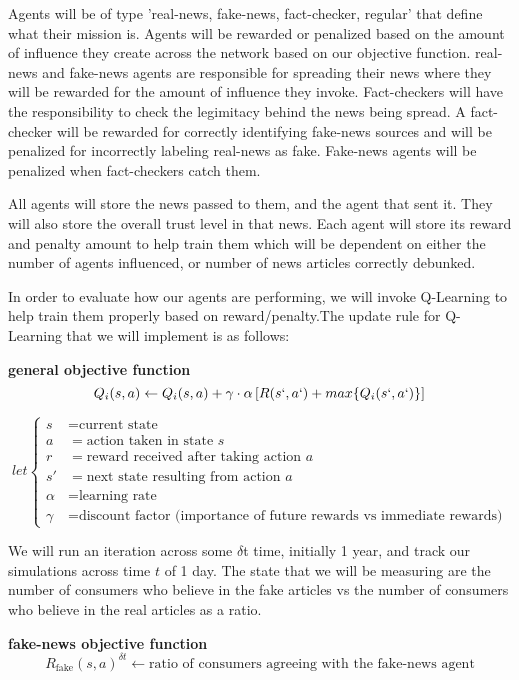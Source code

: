 \documentclass[twoside]{article}
\begin{document}
Agents will be of type 'real-news, fake-news, fact-checker, regular' that define what their mission is. Agents will be rewarded or penalized based on the amount of influence they create across the network based on our objective function. real-news and fake-news agents are responsible for spreading their news where they will be rewarded for the amount of influence they invoke. Fact-checkers will have the responsibility to check the legimitacy behind the news being spread. A fact-checker will be rewarded for correctly identifying fake-news sources and will be penalized for incorrectly labeling real-news as fake. Fake-news agents will be penalized when fact-checkers catch them.

All agents will store the news passed to them, and the agent that sent it. They will also store the overall trust level in that news. Each agent will store its reward and penalty amount to help train them which will be dependent on either the number of agents influenced, or number of news articles correctly debunked.

In order to evaluate how our agents are performing, we will invoke Q-Learning to help train them properly based on reward/penalty.The update rule for Q-Learning that we will implement is as follows:

\textbf{general objective function}
\[Q_{i}(s, a) \leftarrow Q_{i}(s, a) + \gamma \cdot \alpha  \left[R(s`, a`) + max \{Q_{i}(s`, a`)\}\right]\]

\[
let \left\{
\begin{aligned}
s & = \text{current state} \\
a & = \text{action taken in state } s \\
r & = \text{reward received after taking action } a \\
s' & = \text{next state resulting from action } a \\
\alpha & = \text{learning rate} \\
\gamma & = \text{discount factor (importance of future rewards vs immediate rewards)}
\end{aligned}
\right.
\]

We will run an iteration across some $\delta$t time, initially 1 year, and track our simulations across time $t$ of 1 day. The state that we will be measuring are the number of consumers who believe in the fake articles vs the number of consumers who believe in the real articles as a ratio.

\textbf{fake-news objective function}
\[R_{\text{fake}}(s, a)^{\delta t} \leftarrow \text{ratio of consumers agreeing with the fake-news agent}
\]
\end{document}

